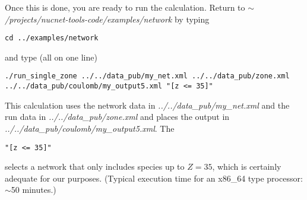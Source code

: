 Once this is done, you are ready to run the calculation.  Return to
{\em $\sim$/projects/nucnet-tools-code/examples/network}
by typing
\begin{verbatim}
cd ../examples/network
\end{verbatim}
and type (all on one line)
\begin{verbatim}
./run_single_zone ../../data_pub/my_net.xml ../../data_pub/zone.xml ../../data_pub/coulomb/my_output5.xml "[z <= 35]"
\end{verbatim}
This calculation uses the network data in {\em ../../data\_pub/my\_net.xml}
and the run data in {\em ../../data\_pub/zone.xml} and places the output
in {\em ../../data\_pub/coulomb/my\_output5.xml}.  The
\begin{verbatim}"[z <= 35]"\end{verbatim} selects a network that only includes
species up to $Z = 35$, which is certainly adequate for our purposes.
(Typical execution time for an x86\_64 type processor: $\sim$50 minutes.)

